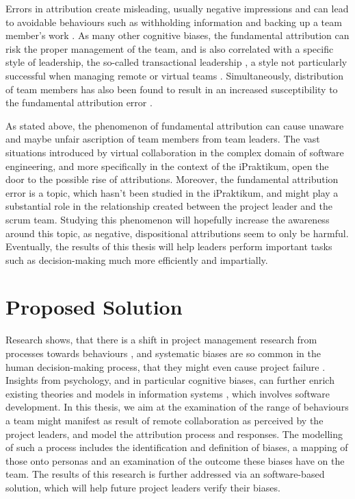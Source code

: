 
Errors in attribution create misleading, usually negative impressions and can lead to avoidable behaviours such as withholding information and backing up a team member’s work \cite{Al-Ani2013}. As many other cognitive biases, the fundamental attribution can risk the proper management of the team, and is also correlated with a specific style of leadership, the so-called transactional leadership \cite{Masood2012}, a style not particularly successful when managing remote or virtual teams \cite{Howell2005} \cite{Purvanova2009}. Simultaneously,  distribution of team members has also been found to result in an increased susceptibility to the fundamental attribution error \cite{Thompson2006}. 

As stated above, the phenomenon of fundamental attribution can cause unaware and maybe unfair ascription of team members from team leaders. The vast situations introduced by virtual collaboration in the complex domain of software engineering, and more specifically in the context of the iPraktikum, open the door to the possible rise of attributions.  Moreover, the fundamental attribution error is a topic, which hasn't been studied in the iPraktikum, and might play a substantial role in the relationship created between the project leader and the scrum team. Studying this phenomenon will hopefully increase the awareness around this topic,  as negative, dispositional attributions seem to only be harmful.  Eventually, the results of this thesis will help leaders perform important tasks such as decision-making much more efficiently and impartially.

\section{Proposed Solution}

Research shows, that there is a shift in project management research from processes towards behaviours \cite{Leybourne2007}, and systematic biases are so common in the human decision-making process, that they might even cause project failure \cite{Shore2008}. Insights from  psychology, and in particular cognitive biases, can further enrich existing theories and models in information systems \cite{Fleischmann2014}, which involves software development. In this thesis, we aim at the examination of the range of behaviours a team might manifest as result of remote collaboration as perceived by the project leaders, and model the attribution process and responses. The modelling of such a process includes the identification and definition of biases, a mapping of those onto personas and an examination of the outcome these biases have on the team. The results of this research is further addressed via an software-based solution, which will help future project leaders verify their biases.


